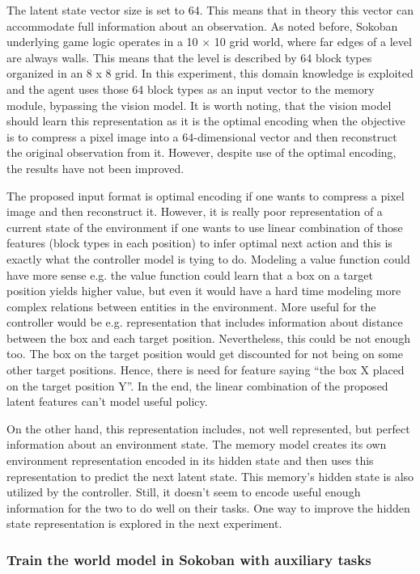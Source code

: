 The latent state vector size is set to 64. This means that in theory this vector can accommodate full information about an observation. As noted before, Sokoban underlying game logic operates in a 10 × 10 grid world, where far edges of a level are always walls. This means that the level is described by 64 block types organized in an 8 x 8 grid. In this experiment, this domain knowledge is exploited and the agent uses those 64 block types as an input vector to the memory module, bypassing the vision model. It is worth noting, that the vision model should learn this representation as it is the optimal encoding when the objective is to compress a pixel image into a 64-dimensional vector and then reconstruct the original observation from it. However, despite use of the optimal encoding, the results have not been improved.

The proposed input format is optimal encoding if one wants to compress a pixel image and then reconstruct it. However, it is really poor representation of a current state of the environment if one wants to use linear combination of those features (block types in each position) to infer optimal next action and this is exactly what the controller model is tying to do. Modeling a value function could have more sense e.g. the value function could learn that a box on a target position yields higher value, but even it would have a hard time modeling more complex relations between entities in the environment. More useful for the controller would be e.g. representation that includes information about distance between the box and each target position. Nevertheless, this could be not enough too. The box on the target position would get discounted for not being on some other target positions. Hence, there is need for feature saying “the box X placed on the target position Y”. In the end, the linear combination of the proposed latent features can't model useful policy.

On the other hand, this representation includes, not well represented, but perfect information about an environment state. The memory model creates its own environment representation encoded in its hidden state and then uses this representation to predict the next latent state. This memory's hidden state is also utilized by the controller. Still, it doesn't seem to encode useful enough information for the two to do well on their tasks. One way to improve the hidden state representation is explored in the next experiment.

\subsubsection{Train the world model in Sokoban with auxiliary tasks}

